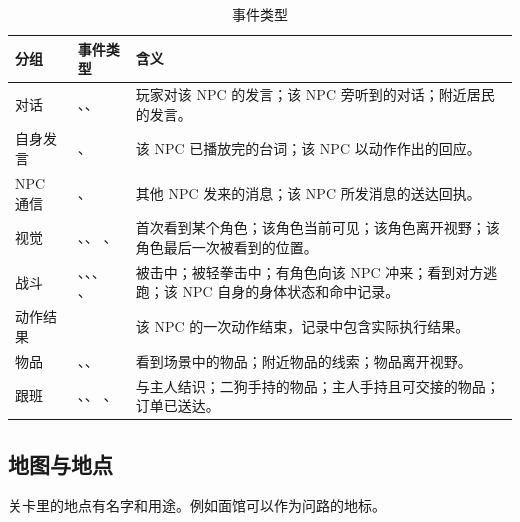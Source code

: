 \documentclass[11pt]{article}
\begin{document}
\begin{table}[H]
\small
\begin{tabularx}{\textwidth}{@{}l >{\raggedright\arraybackslash}p{6.3cm} L@{}}
\toprule
\textbf{分组} & \textbf{事件类型} & \textbf{含义} \\
\midrule
对话 & 、、 & 玩家对该 NPC 的发言；该 NPC 旁听到的对话；附近居民的发言。 \\
自身发言 & 、 & 该 NPC 已播放完的台词；该 NPC 以动作作出的回应。 \\
NPC 通信 & 、 & 其他 NPC 发来的消息；该 NPC 所发消息的送达回执。 \\
视觉 & 、、 、 & 首次看到某个角色；该角色当前可见；该角色离开视野；该角色最后一次被看到的位置。 \\
战斗 & 、、、 、 & 被击中；被轻拳击中；有角色向该 NPC 冲来；看到对方逃跑；该 NPC 自身的身体状态和命中记录。 \\
动作结果 &  & 该 NPC 的一次动作结束，记录中包含实际执行结果。 \\
物品 & 、、  & 看到场景中的物品；附近物品的线索；物品离开视野。 \\
跟班 & 、、 、  & 与主人结识；二狗手持的物品；主人手持且可交接的物品；订单已送达。 \\
\bottomrule
\end{tabularx}
\caption{事件类型}
\end{table}

\subsection{地图与地点}

关卡里的地点有名字和用途。例如面馆可以作为问路的地标。
\end{document}
